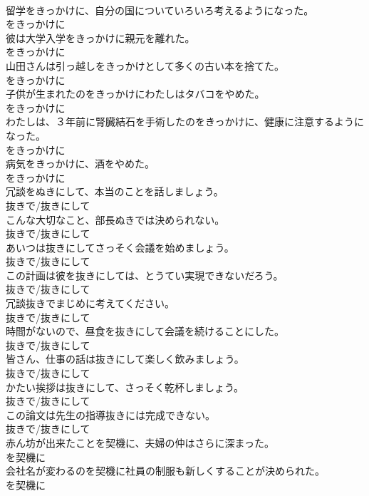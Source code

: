 \documentclass[8pt]{extreport}
\begin{document}
\begin{CJK}{UTF8}{min}
\\	留学をきっかけに、自分の国についていろいろ考えるようになった。	
\\	をきっかけに	
\\	彼は大学入学をきっかけに親元を離れた。	
\\	をきっかけに	
\\	山田さんは引っ越しをきっかけとして多くの古い本を捨てた。	
\\	をきっかけに	
\\	子供が生まれたのをきっかけにわたしはタバコをやめた。	
\\	をきっかけに	
\\	わたしは、３年前に腎臓結石を手術したのをきっかけに、健康に注意するようになった。	
\\	をきっかけに	
\\	病気をきっかけに、酒をやめた。	
\\	をきっかけに	
\\	冗談をぬきにして、本当のことを話しましょう。	
\\	抜きで/抜きにして	
\\	こんな大切なこと、部長ぬきでは決められない。	
\\	抜きで/抜きにして	
\\	あいつは抜きにしてさっそく会議を始めましょう。	
\\	抜きで/抜きにして	
\\	この計画は彼を抜きにしては、とうてい実現できないだろう。	
\\	抜きで/抜きにして	
\\	冗談抜きでまじめに考えてください。	
\\	抜きで/抜きにして	
\\	時間がないので、昼食を抜きにして会議を続けることにした。	
\\	抜きで/抜きにして	
\\	皆さん、仕事の話は抜きにして楽しく飲みましょう。	
\\	抜きで/抜きにして	
\\	かたい挨拶は抜きにして、さっそく乾杯しましょう。	
\\	抜きで/抜きにして	
\\	この論文は先生の指導抜きには完成できない。	
\\	抜きで/抜きにして	
\\	赤ん坊が出来たことを契機に、夫婦の仲はさらに深まった。	
\\	を契機に	
\\	会社名が変わるのを契機に社員の制服も新しくすることが決められた。	
\\	を契機に	

\end{CJK}
\end{document}

